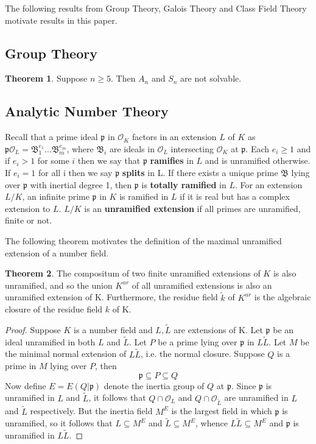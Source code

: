 \documentclass[12pt]{extarticle}
\newcommand{\<}{\langle}
\renewcommand{\>}{\rangle}
\theoremstyle{definition}
\newtheorem{theorem}{Theorem}
\begin{document}
The following results from Group Theory, Galois Theory and Class Field Theory motivate results in this paper.  

\subsection{Group Theory}
\begin{theorem}
Suppose $n \geq 5$. Then $A_n$ and $S_n$ are not solvable. 
\end{theorem}
\subsection{Analytic Number Theory}
Recall that a prime ideal $\mathfrak{p}$ in $\mathcal{O}_K$ factors in an extension $L$ of $K$ as
$\mathfrak{p}\mathcal{O}_L=\mathfrak{B}_1^{e_1}...\mathfrak{B}_m^{e_m}$, where $\mathfrak{B}_i$ are ideals in $\mathcal{O}_L$ intersecting $\mathcal{O}_K$ at $\mathfrak{p}$. Each $e_i\geq1$ and if $e_i>1$ for some $i$ then we say that $\mathfrak{p}$ \textbf{ramifies} in $L$ and is unramified otherwise. If $e_i=1$ for all i then we say $\mathfrak{p}$ \textbf{splits} in L. If there exists a unique prime $\mathfrak{B}$ lying over $\mathfrak{p}$ with inertial degree 1, then $\mathfrak{p}$ is \textbf{totally ramified} in $L$. For an extension $L/K$, an infinite prime $\mathfrak{p}$ in $K$ is ramified in $L$ if it is real but has a complex extension to $L$. $L/K$ is an \textbf{unramified extension} if all primes are unramified, finite or not. 
\par
The following theorem  motivates the definition of the maximal unramified extension of a number field. 
\begin{theorem}
The compositum of two finite unramified extensions of $K$ is also unramified, and so the union $K^{ur}$ of all unramified extensions is also an unramified extension of K. Furthermore, the residue field $\tilde{k}$ of $K^{ur}$ is the algebraic closure of the residue field $k$ of K.
\end{theorem}
\begin{proof}
    Suppose $K$ is a number field and $L,\tilde{L}$ are extensions of K. Let $\mathfrak{p}$ be an ideal unramified in both $L$ and $\tilde{L}$. Let $P$ be a prime lying over $\mathfrak{p}$ in $L\tilde{L}$. Let $M$ be the minimal normal extension of $L\tilde{L}$, i.e. the normal closure. Suppose $Q$ is a prime in $M$ lying over $P$, then  
    \begin{equation}
        \mathfrak{p}\subseteq P \subseteq Q
    \end{equation}
    Now define $E=E(Q|\mathfrak{p})$ denote the inertia group of $Q$ at $\mathfrak{p}$. 
    Since $\mathfrak{p}$ is unramified in $L$ and $\tilde{L}$, it follows that $Q \cap \mathcal{O}_L$ and $Q \cap \mathcal{O}_{\tilde{L}}$ are unramified in $L$ and $\tilde{L}$ respectively. 
 But the inertia field $M^E$ is the largest field in which $\mathfrak{p}$ is unramified, so it follows that $L\subseteq M^E$ and $\tilde{L} \subseteq M^E $, whence $L\tilde{L}\subseteq M^E$ and $\mathfrak{p}$ is unramified in $L\tilde{L}$.
\end{proof}
\end{document}
